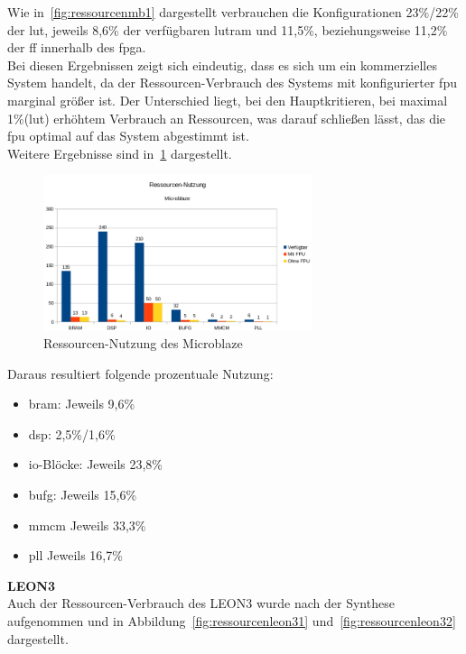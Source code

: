 Wie in~\ref{fig:ressourcenmb1} dargestellt verbrauchen die Konfigurationen 23\%/22\% der \ac{lut}, jeweils 8,6\% der verfügbaren \ac{lutram} und 11,5\%, beziehungsweise 11,2\% der \ac{ff}
innerhalb des \ac{fpga}.\\
Bei diesen Ergebnissen zeigt sich eindeutig, dass es sich um ein kommerzielles System handelt, da der Ressourcen-Verbrauch des Systems mit konfigurierter \ac{fpu}
marginal größer ist. Der Unterschied liegt, bei den Hauptkritieren, bei maximal 1\%(\ac{lut}) erhöhtem Verbrauch an Ressourcen, was darauf schließen lässt, das die \ac{fpu} optimal auf das System
abgestimmt ist.\\

Weitere Ergebnisse sind in~\ref{fig:ressourcenmb2} dargestellt.\\

\begin{figure}[H]
\centering
\includegraphics[width=0.7\textwidth]{Hauptteil/ressourcenmb2.png}
\caption{Ressourcen-Nutzung des Microblaze}
\label{fig:ressourcenmb2}
\end{figure}

Daraus resultiert folgende prozentuale Nutzung:\\
\begin{itemize}
  \item \ac{bram}: Jeweils 9,6\%
  \item \ac{dsp}: 2,5\%/1,6\%
  \item \ac{io}-Blöcke: Jeweils 23,8\%
  \item \ac{bufg}: Jeweils 15,6\%
  \item \ac{mmcm} Jeweils 33,3\%
  \item \ac{pll} Jeweils 16,7\%
\end{itemize}

\newpage
\textbf{LEON3}\\
Auch der Ressourcen-Verbrauch des LEON3 wurde nach der Synthese aufgenommen und in Abbildung~\ref{fig:ressourcenleon31} und~\ref{fig:ressourcenleon32} dargestellt.\\

